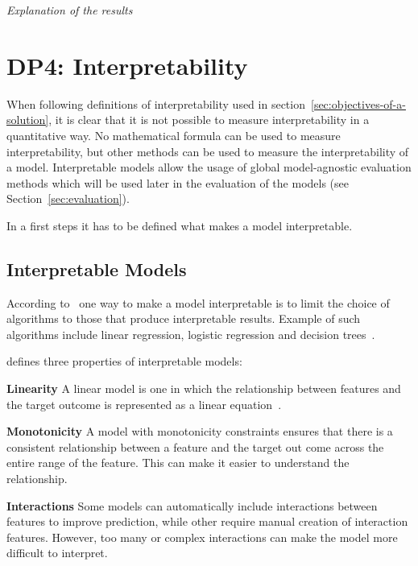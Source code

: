 \textit{Explanation of the results}


\section{DP4: Interpretability}\label{sec:interpretability}



When following definitions of interpretability used in section~\ref{sec:objectives-of-a-
solution}, it is clear that it
is not possible to
measure interpretability in a quantitative way.
No mathematical formula can be used to measure interpretability, but other
methods can be used to
measure the interpretability of a model.
Interpretable models allow the usage of global model-agnostic evaluation
methods which will be
used later in the evaluation of the models (see Section~\ref{sec:evaluation}).

In a first steps it has to be defined what makes a model interpretable.

\subsection*{Interpretable Models}
According to~\cite{molnar2020interpretable} one way to make a model
interpretable is to limit the
choice of algorithms to those that produce interpretable results. Example of
such
algorithms include linear regression, logistic regression and decision
trees~\cite[p.
35]{molnar2020interpretable}.

\cite{molnar2020interpretable} defines three properties of interpretable models:

\textbf{Linearity} A linear model is one in which the relationship between
features and the
target outcome is represented as a linear
equation~\cite[]{molnar2020interpretable}.

\textbf{Monotonicity} A model with monotonicity constraints ensures that
there is a consistent
relationship between a feature and the target out come across the entire
range of the feature.
This can make it easier to understand the relationship.

\textbf{Interactions} Some models can automatically include
interactions between features to improve prediction, while other require
manual creation of
interaction features.
However, too many or complex interactions can make the model more
difficult to interpret.

